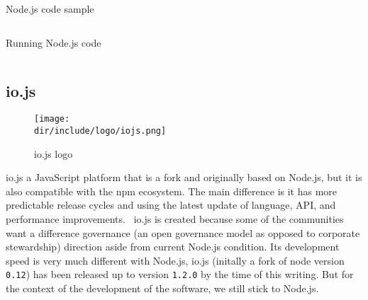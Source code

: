 \begin{listing}[!h]
\caption{Node.js code sample}
\inputminted{javascript}{\dir/include/node-sample.js}
\label{lst:node-sample}
\end{listing}

\begin{listing}[!h]
\caption{Running Node.js code}
\inputminted{shell-session}{\dir/include/node-run.shell-session}
\label{lst:node-run}
\end{listing}


\clearpage

\subsection{io.js}

\begin{wrapfigure}{r}{0.5\textwidth}
  \vspace{-20pt}
  \begin{center}
    \texttt{[image: \\dir/include/logo/iojs.png]}
  \end{center}
  \vspace{-20pt}
  \caption{io.js logo}
  \label{fig:iojs-logo}
  \vspace{-10pt}
\end{wrapfigure}

io.js a JavaScript platform that is a fork and originally based on Node.js, but it is also compatible with the \ac{npm} ecosystem.
The main difference is it has more predictable release cycles and using the latest update of language, API, and performance improvements.~\autocite{iojs:2015}
io.js is created because some of the communities want a difference governance (an open governance model as opposed to corporate stewardship) direction aside from current Node.js condition.
Its development speed is very much different with Node.js, io.js (initally a fork of node version \verb|0.12|) has been released up to version \verb|1.2.0| by the time of this writing.
But for the context of the development of the software, we still stick to Node.js.
